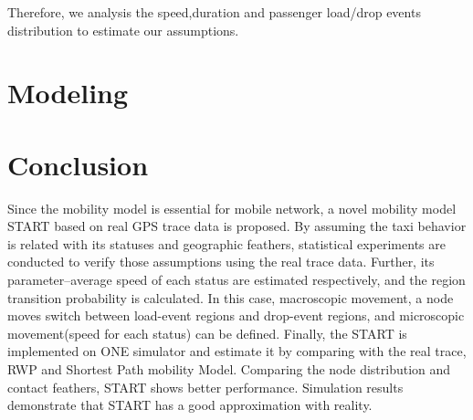 \documentclass[camera-ready,twocolumn,10pt]{IEEEtran}
\begin{document}
   Therefore, we analysis the speed,duration and passenger load/drop events distribution to estimate our assumptions.








\section{Modeling}
\label{section_modeling}








\section{Conclusion}
\label{section_conclusion}
Since the mobility model is essential for mobile network, a novel mobility model START based on real GPS trace data is proposed. By assuming the taxi behavior is related with its statuses and geographic feathers, statistical experiments are conducted to verify those assumptions using the real trace data. Further, its parameter--average speed of each status are estimated respectively, and the region transition probability is calculated. In this case, macroscopic movement, a node moves switch between load-event regions and drop-event regions, and microscopic movement(speed for each status) can be defined. Finally, the START is implemented on ONE simulator and estimate it by comparing with the real trace, RWP and Shortest Path mobility Model.
Comparing the node distribution and contact feathers, START shows better performance.
Simulation results demonstrate that START has a good approximation with reality.






\end{document}
